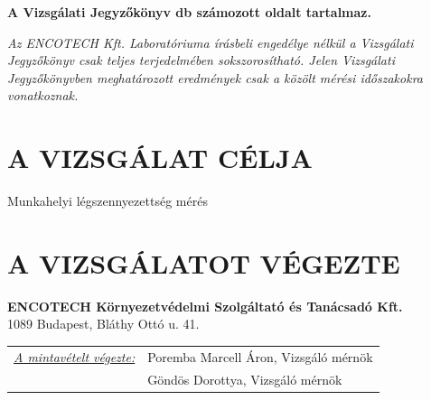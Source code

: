 \documentclass[a4paper,12pt]{article}
\begin{document}
	\begin{center}
		\textbf{A Vizsgálati Jegyzőkönyv \pageref{LastPage} db számozott oldalt tartalmaz.}
	\end{center}    
	
	\begin{center}
		{\scriptsize 
			\textit{
				Az ENCOTECH Kft. Laboratóriuma írásbeli engedélye nélkül a Vizsgálati Jegyzőkönyv csak teljes terjedelmében sokszorosítható. 
				Jelen Vizsgálati Jegyzőkönyvben meghatározott eredmények csak a közölt mérési időszakokra vonatkoznak.
		}}  
	\end{center}
	
	\newpage
	

	\tableofcontents
	

	\newpage  %
	\pagestyle{report}
	
	
	\section{A VIZSGÁLAT CÉLJA}
		\begin{adjustwidth}{1cm}{0cm}
		Munkahelyi légszennyezettség mérés
		\end{adjustwidth}
	
	
	\section{A VIZSGÁLATOT VÉGEZTE}
		\begin{adjustwidth}{1cm}{0cm}
			\noindent
			\textbf{ENCOTECH Környezetvédelmi Szolgáltató és Tanácsadó Kft.} \\
			1089 Budapest, Bláthy Ottó u. 41.
			
			\vspace{1.0em} %
			
			\noindent
			\begin{tabular}{ p{5.5cm} p{8cm} } 
				\textit{\underline{A mintavételt végezte:}} & Poremba Marcell Áron, Vizsgáló mérnök \\ & Göndös Dorottya, Vizsgáló mérnök \\ 
			\end{tabular}
		\end{adjustwidth}
	
\end{document}
